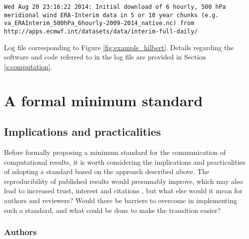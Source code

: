 \begin{featurebox}
\begin{tcolorbox}[width=\textwidth]
\begin{lstlisting}[basicstyle=\footnotesize\ttfamily, breaklines=true]
Wed Aug 20 23:16:22 2014: Initial download of 6 hourly, 500 hPa meridional wind ERA-Interim data in 5 or 10 year chunks (e.g. va_ERAInterim_500hPa_6hourly-2009-2014_native.nc) from http://apps.ecmwf.int/datasets/data/interim-full-daily/
\end{lstlisting}

\end{tcolorbox}

\caption{\label{box:log_file}
Log file corresponding to Figure \ref{fig:example_hilbert}. Details regarding the software and code referred to in the log file are provided in Section \ref{s:computation}.}

\end{featurebox}  
 
 

\section{A formal minimum standard}\label{s:reproducibility_standards}

\subsection{Implications and practicalities}

Before formally proposing a minimum standard for the communication of computational results, it is worth considering the implications and practicalities of adopting a standard based on the approach described above. The reproducibility of published results would presumably improve, which may also lead to increased trust, interest and citations \citep{Piwowar2007}, but what else would it mean for authors and reviewers? Would there be barriers to overcome in implementing such a standard, and what could be done to make the transition easier?

\subsubsection{Authors}

